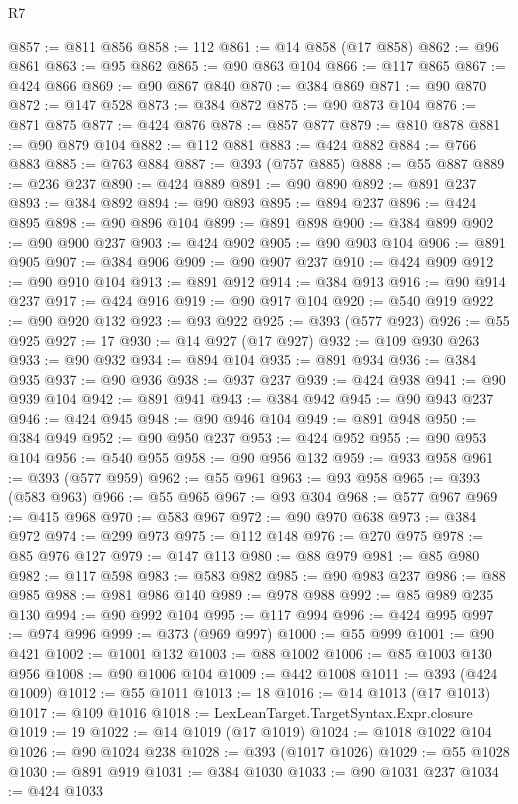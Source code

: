 \begin{lexlean}{R7}
\begin{coremodule}
@857 := @811 @856
@858 := 112
@861 := @14 @858 (@17 @858)
@862 := @96 @861
@863 := @95 @862
@865 := @90 @863 @104
@866 := @117 @865
@867 := @424 @866
@869 := @90 @867 @840
@870 := @384 @869
@871 := @90 @870
@872 := @147 @528
@873 := @384 @872
@875 := @90 @873 @104
@876 := @871 @875
@877 := @424 @876
@878 := @857 @877
@879 := @810 @878
@881 := @90 @879 @104
@882 := @112 @881
@883 := @424 @882
@884 := @766 @883
@885 := @763 @884
@887 := @393 (@757 @885)
@888 := @55 @887
@889 := @236 @237
@890 := @424 @889
@891 := @90 @890
@892 := @891 @237
@893 := @384 @892
@894 := @90 @893
@895 := @894 @237
@896 := @424 @895
@898 := @90 @896 @104
@899 := @891 @898
@900 := @384 @899
@902 := @90 @900 @237
@903 := @424 @902
@905 := @90 @903 @104
@906 := @891 @905
@907 := @384 @906
@909 := @90 @907 @237
@910 := @424 @909
@912 := @90 @910 @104
@913 := @891 @912
@914 := @384 @913
@916 := @90 @914 @237
@917 := @424 @916
@919 := @90 @917 @104
@920 := @540 @919
@922 := @90 @920 @132
@923 := @93 @922
@925 := @393 (@577 @923)
@926 := @55 @925
@927 := 17
@930 := @14 @927 (@17 @927)
@932 := @109 @930 @263
@933 := @90 @932
@934 := @894 @104
@935 := @891 @934
@936 := @384 @935
@937 := @90 @936
@938 := @937 @237
@939 := @424 @938
@941 := @90 @939 @104
@942 := @891 @941
@943 := @384 @942
@945 := @90 @943 @237
@946 := @424 @945
@948 := @90 @946 @104
@949 := @891 @948
@950 := @384 @949
@952 := @90 @950 @237
@953 := @424 @952
@955 := @90 @953 @104
@956 := @540 @955
@958 := @90 @956 @132
@959 := @933 @958
@961 := @393 (@577 @959)
@962 := @55 @961
@963 := @93 @958
@965 := @393 (@583 @963)
@966 := @55 @965
@967 := @93 @304
@968 := @577 @967
@969 := @415 @968
@970 := @583 @967
@972 := @90 @970 @638
@973 := @384 @972
@974 := @299 @973
@975 := @112 @148
@976 := @270 @975
@978 := @85 @976 @127
@979 := @147 @113
@980 := @88 @979
@981 := @85 @980
@982 := @117 @598
@983 := @583 @982
@985 := @90 @983 @237
@986 := @88 @985
@988 := @981 @986 @140
@989 := @978 @988
@992 := @85 @989 @235 @130
@994 := @90 @992 @104
@995 := @117 @994
@996 := @424 @995
@997 := @974 @996
@999 := @373 (@969 @997)
@1000 := @55 @999
@1001 := @90 @421
@1002 := @1001 @132
@1003 := @88 @1002
@1006 := @85 @1003 @130 @956
@1008 := @90 @1006 @104
@1009 := @442 @1008
@1011 := @393 (@424 @1009)
@1012 := @55 @1011
@1013 := 18
@1016 := @14 @1013 (@17 @1013)
@1017 := @109 @1016
@1018 := LexLeanTarget.TargetSyntax.Expr.closure
@1019 := 19
@1022 := @14 @1019 (@17 @1019)
@1024 := @1018 @1022 @104
@1026 := @90 @1024 @238
@1028 := @393 (@1017 @1026)
@1029 := @55 @1028
@1030 := @891 @919
@1031 := @384 @1030
@1033 := @90 @1031 @237
@1034 := @424 @1033

\end{coremodule}
\end{lexlean}
